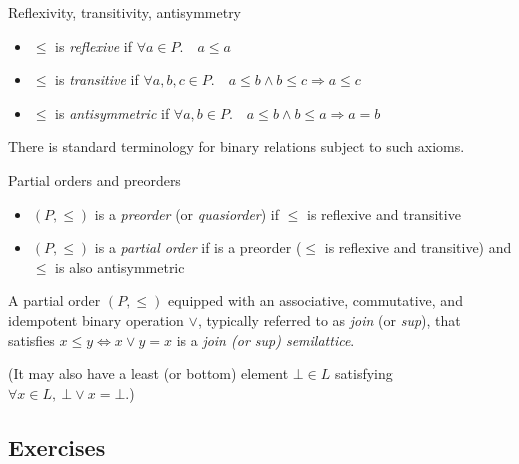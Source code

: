 \begin{definition}
Reflexivity, transitivity, antisymmetry
\begin{itemize}[noitemsep,topsep=0pt]
    \item $\leq$ is \textit{reflexive} if $\forall a \in P.\quad a \leq a$
    \item $\leq$ is \textit{transitive} if
      $\forall a,b,c \in P. \quad a \leq b \wedge b \leq c \Rightarrow a \leq c$
    \item $\leq$ is \textit{antisymmetric} if $\forall a,b \in P. \quad
      a \leq b \wedge b \leq a \Rightarrow a = b$
\end{itemize}
\end{definition}

There is standard terminology for binary relations subject to such axioms.

\begin{definition} Partial orders and preorders
\begin{itemize}[noitemsep,topsep=0pt]
\item $(P, \leq)$ is a \emph{preorder} (or \emph{quasiorder}) if $\leq$ is
reflexive and transitive
\item $(P, \leq)$ is a \emph{partial order} if is a preorder ($\leq$ is
  reflexive and transitive) and $\leq$ is also antisymmetric
\end{itemize}
\end{definition}

\begin{definition}
A partial order $(P, \leq)$ equipped with an associative, commutative, and
idempotent binary operation $\lor$, typically referred to as \emph{join} (or
\emph{sup}), that satisfies $x \leq y \iff x \vee y = x$ is a \emph{join (or
sup) semilattice}.

(It may also have a least (or bottom) element $\bot \in L$ satisfying
$\forall x \in L,~\bot\lor x = \bot$.)
\end{definition}

\subsection{Exercises}

